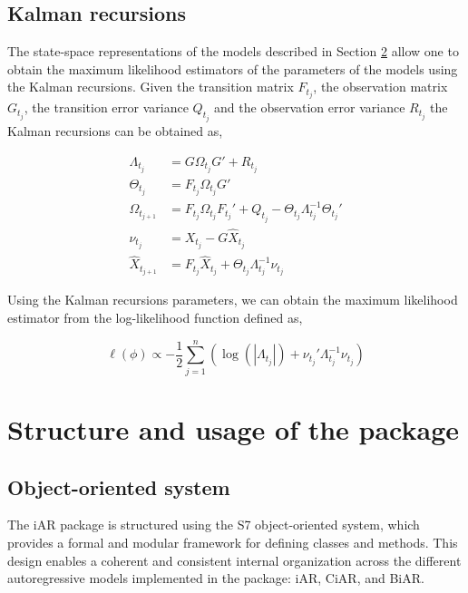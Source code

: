 \subsection{Kalman recursions}\label{kalman-recursions}

The state-space representations of the models described in Section \hyperref[models]{2} allow one to obtain the maximum likelihood estimators of the parameters of the models using the Kalman recursions. Given the transition matrix \(F_{t_j}\), the observation matrix \(G_{t_j}\), the transition error variance \(Q_{t_j}\) and the observation error variance \(R_{t_j}\) the Kalman recursions can be obtained as,

\begin{equation} 
\begin{split}
\Lambda_{t_j} &= G \Omega_{t_j} G' + R_{t_j} \\
\Theta_{t_j} &= F_{t_j}\Omega_{t_j} G' \\
\Omega_{t_{j+1}} &= F_{t_j} \Omega_{t_j} F_{t_j}' + Q_{t_j}  - \Theta_{t_j} \Lambda_{t_j}^{-1} \Theta_{t_j}' \\
\nu_{t_j}  &= X_{t_j} - G \hat{X}_{t_j}\\
\hat{X}_{t_{j+1}}  &= F_{t_j} \hat{X}_{t_j} +  \Theta_{t_j} \Lambda_{t_j}^{-1} \nu_{t_j}
\end{split}
\label{eq:Kalman}
\end{equation}

Using the Kalman recursions parameters, we can obtain the maximum likelihood estimator from the log-likelihood function defined as,

\begin{equation}
\ell(\phi) \propto  - \frac{1}{2} \mathop{\sum}\limits_{j=1}^n \left( \log (|\Lambda_{t_j}|) + \nu_{t_j}' \Lambda_{t_j}^{-1} \nu_{t_j} \right)
\end{equation}

\section{\texorpdfstring{Structure and usage of the  package}{Structure and usage of the  package}}\label{sec:usage}

\subsection{Object-oriented system}\label{object-oriented-system}

The iAR package is structured using the S7 object-oriented system, which provides a formal and modular framework for defining classes and methods. This design enables a coherent and consistent internal organization across the different autoregressive models implemented in the package: iAR, CiAR, and BiAR.

